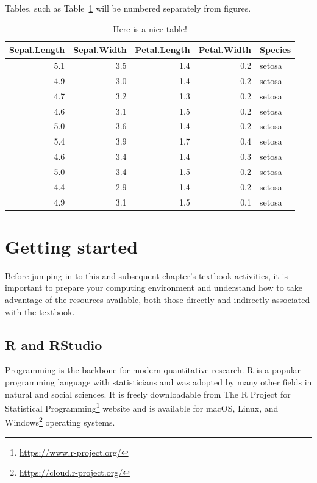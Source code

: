 \documentclass[
  letterpaper,
]{scrbook}
\DeclareRobustCommand{\href}[2]{#2\footnote{\url{#1}}}
\begin{document}
Tables, such as Table~\ref{tbl-test-table} will be numbered separately
from figures.

\hypertarget{tbl-test-table}{}
\begin{table}
\caption{\label{tbl-test-table}Here is a nice table! }\tabularnewline

\centering
\begin{tabular}{r|r|r|r|l}
\hline
Sepal.Length & Sepal.Width & Petal.Length & Petal.Width & Species\\
\hline
5.1 & 3.5 & 1.4 & 0.2 & setosa\\
\hline
4.9 & 3.0 & 1.4 & 0.2 & setosa\\
\hline
4.7 & 3.2 & 1.3 & 0.2 & setosa\\
\hline
4.6 & 3.1 & 1.5 & 0.2 & setosa\\
\hline
5.0 & 3.6 & 1.4 & 0.2 & setosa\\
\hline
5.4 & 3.9 & 1.7 & 0.4 & setosa\\
\hline
4.6 & 3.4 & 1.4 & 0.3 & setosa\\
\hline
5.0 & 3.4 & 1.5 & 0.2 & setosa\\
\hline
4.4 & 2.9 & 1.4 & 0.2 & setosa\\
\hline
4.9 & 3.1 & 1.5 & 0.1 & setosa\\
\hline
\end{tabular}
\end{table}

\hypertarget{getting-started}{%
\section*{Getting started}\label{getting-started}}


Before jumping in to this and subsequent chapter's textbook activities,
it is important to prepare your computing environment and understand how
to take advantage of the resources available, both those directly and
indirectly associated with the textbook.

\hypertarget{r-and-rstudio}{%
\subsection*{R and RStudio}\label{r-and-rstudio}}

Programming is the backbone for modern quantitative research. R is a
popular programming language with statisticians and was adopted by many
other fields in natural and social sciences. It is freely downloadable
from \href{https://www.r-project.org/}{The R Project for Statistical
Programming} website and is available for
\href{https://cloud.r-project.org/}{macOS, Linux, and Windows} operating
systems.
\end{document}
